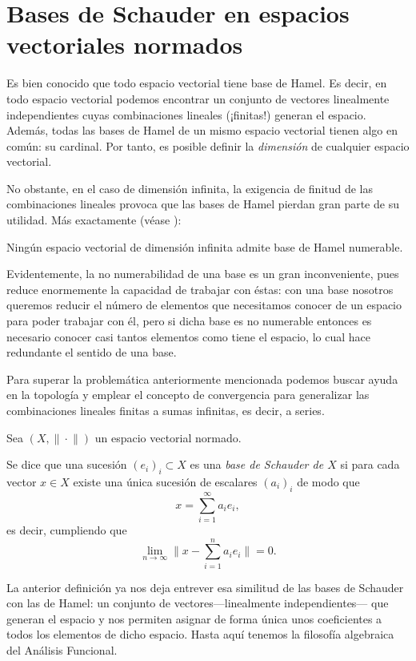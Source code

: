 	\section{Bases de Schauder en espacios vectoriales normados}
	
	Es bien conocido que todo espacio vectorial tiene base de Hamel. Es decir, en todo espacio vectorial podemos encontrar un conjunto de vectores linealmente independientes cuyas combinaciones lineales (¡finitas!) generan el espacio. Además, todas las bases de Hamel de un mismo espacio vectorial tienen algo en común: su cardinal. Por tanto, es posible definir la \emph{dimensión} de cualquier espacio vectorial.
	
	No obstante, en el caso de dimensión infinita, la exigencia de finitud de las combinaciones lineales provoca que las bases de Hamel pierdan gran parte de su utilidad. Más exactamente (véase \cite[pág.48]{BST}):
	
	\begin{theorem}
		Ningún espacio vectorial de dimensión infinita admite base de Hamel numerable. 
	\end{theorem}
	
	Evidentemente, la no numerabilidad de una base es un gran inconveniente, pues reduce enormemente la capacidad de trabajar con éstas: con una base nosotros queremos reducir el número de elementos que necesitamos conocer de un espacio para poder trabajar con él, pero si dicha base es no numerable entonces es necesario conocer casi tantos elementos como tiene el espacio, lo cual hace redundante el sentido de una base.
	
	Para superar la problemática anteriormente mencionada podemos buscar ayuda en la topología y emplear el concepto de convergencia para generalizar las combinaciones lineales finitas a sumas infinitas, es decir, a series.
	
	Sea $(X,\|\!\cdot\!\|)$ un espacio vectorial normado.
	
	\begin{definition}\label{def:bs} 
		Se dice que una sucesión $(e_i)_i\subset X$ es una \emph{base de Schauder de $X$} si para cada vector $x\in X$ existe una única sucesión de escalares $(a_i)_i$ de modo que 
		\[x=\sum_{i=1}^{\infty}{a_ie_i},\]
		es decir, cumpliendo que 
		\[\lim_{n\rightarrow\infty}\big\|x-\sum_{i=1}^{n}{a_ie_i}\big\|=0.\]
	\end{definition}
	
	La anterior definición ya nos deja entrever esa similitud de las bases de Schauder con las de Hamel: un conjunto de vectores---linealmente independientes--- que generan el espacio y nos permiten asignar de forma única unos coeficientes a todos los elementos de dicho espacio. Hasta aquí tenemos la filosofía algebraica del Análisis Funcional. 
	
